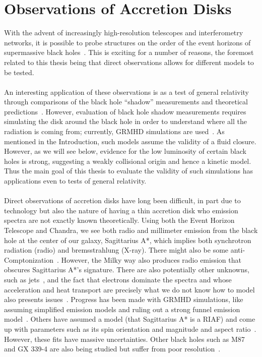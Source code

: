 \section{Observations of Accretion Disks} \label{sec:obsmotive}
With the advent of increasingly high-resolution telescopes and interferometry networks, it is possible to probe structures on the order of the event horizons of supermassive black holes~\cite{Doeleman2009}. This is exciting for a number of reasons, the foremost related to this thesis being that direct observations allows for different models to be tested.\\
\\
An interesting application of these observations is as a test of general relativity through comparisons of the black hole ``shadow'' measurements and theoretical predictions~\cite{Psaltis2015,Moscibrodzka2014}. However, evaluation of black hole shadow measurements requires simulating the disk around the black hole in order to understand where all the radiation is coming from; currently, GRMHD simulations are used~\cite{Psaltis2015}. As mentioned in the Introduction, such models assume the validity of a fluid closure. However, as we will see below, evidence for the low luminosity of certain black holes is strong, suggesting a weakly collisional origin and hence a kinetic model. Thus the main goal of this thesis to evaluate the validity of such simulations has applications even to tests of general relativity.\\
\\
Direct observations of accretion disks have long been difficult, in part due to technology but also the nature of having a thin accretion disk who emission spectra are not exactly known theoretically. Using both the Event Horizon Telescope and Chandra, we see both radio and millimeter emission from the black hole at the center of our galaxy, Sagittarius A*, which implies both synchrotron radiation (radio) and bremsstrahlung (X-ray). There might also be some anti-Comptonization~\cite{Oezel2001}. However, the Milky way also produces radio emission that obscures Sagittarius A*'s signature. There are also potentially other unknowns, such as jets~\cite{Moscibrodzka2014}, and the fact that electrons dominate the spectra and whose acceleration and heat transport are precisely what we do not know how to model also presents issues~\cite{Chan2015}. Progress has been made with GRMHD simulations, like assuming simplified emission models and ruling out a strong funnel emission model~\cite{Chan2015}. Others have assumed a model (that Sagittarius A* is a RIAF) and come up with parameters such as its spin orientation and magnitude and aspect ratio~\cite{Broderick2009,Broderick2011,Dexter2013}. However, these fits have massive uncertainties. Other black holes such as M87 and GX 339-4 are also being studied but suffer from poor resolution~\cite{Plant2014,Mccourt2016}. 

